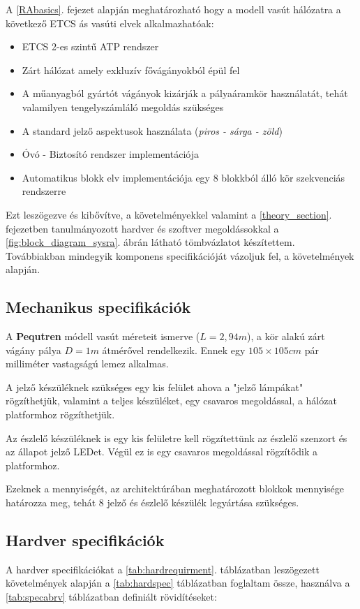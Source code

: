 \documentclass[a4paper,12pt]{article}
\begin{document}
A \ref{RAbasics}. fejezet alapján meghatározható hogy a modell vasút hálózatra a következő ETCS ás vasúti elvek alkalmazhatóak:
\begin{itemize}
	\item ETCS 2-es szintű ATP rendszer 
	\item Zárt hálózat amely exkluzív fővágányokból épül fel
	\item A műanyagból gyártót vágányok kizárják a pályaáramkör használatát, tehát valamilyen tengelyszámláló megoldás szükséges
	\item A standard jelző aspektusok használata (\textit{piros - sárga - zöld})
	\item Óvó - Biztosító rendszer implementációja
	\item Automatikus blokk elv implementációja egy 8 blokkból álló kör szekvenciás rendszerre
\end{itemize}

Ezt leszögezve és kibővítve, a követelményekkel valamint a \ref{theory_section}. fejezetben tanulmányozott hardver és szoftver megoldássokkal a \ref{fig:block_diagram_sysra}. ábrán látható tömbvázlatot készítettem.
Továbbiakban mindegyik komponens specifikációját vázoljuk fel, a követelmények alapján.

\subsection{Mechanikus specifikációk}\label{sec:mechspec}
A \textbf{Pequtren} módell vasút méreteit ismerve ($L = 2,94 m$), a kör alakú zárt vágány pálya $D = 1 m$ átmérővel rendelkezik.
Ennek egy  $105 \times 105 cm$ pár milliméter vastagságú lemez alkalmas.

A jelző készüléknek szükséges egy kis felület ahova a "jelző lámpákat" rögzíthetjük, valamint a teljes készüléket, egy csavaros megoldással, a hálózat platformhoz rögzíthetjük.

Az észlelő készüléknek is egy kis felületre kell rögzítettünk az észlelő szenzort és az állapot jelző LEDet. Végül ez is egy csavaros megoldással rögzítődik a platformhoz. 

Ezeknek a mennyiségét, az architektúrában meghatározott blokkok mennyisége határozza meg, tehát 8 jelző és észlelő készülék legyártása szükséges.

\subsection{Hardver specifikációk}
A hardver specifikációkat a \ref{tab:hardrequirment}. táblázatban leszögezett követelmények alapján a \ref{tab:hardspec} táblázatban foglaltam össze, használva a \ref{tab:specabrv} táblázatban definiált rövidítéseket:
\end{document}
